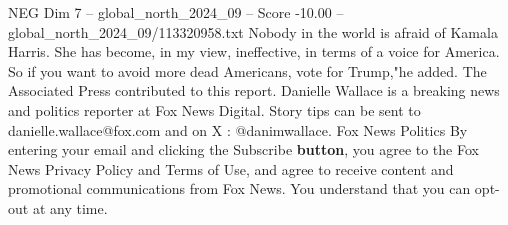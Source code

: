 \begin{textsample}{NEG Dim 7 – global\_north\_2024\_09 – Score -10.00 – global\_north\_2024\_09/113320958.txt}
Nobody in the world is afraid of Kamala Harris.
She has become, in my view, ineffective, in terms of a voice for America.
So if you want to avoid more dead Americans, vote for Trump,"he added.
The Associated Press contributed to this report.
Danielle Wallace is a breaking news and politics reporter at Fox News Digital.
Story tips can be sent to danielle.wallace@fox.com and on X : @danimwallace.
Fox News Politics By entering your email and clicking the Subscribe \textbf{button}, you agree to the Fox News Privacy Policy and Terms of Use, and agree to receive content and promotional communications from Fox News.
You understand that you can opt-out at any time.

\end{textsample}
